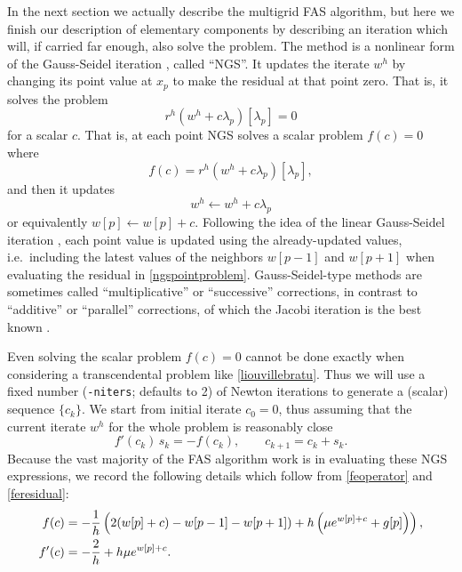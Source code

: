 \documentclass[letterpaper,final,12pt,reqno]{amsart}
\begin{document}
In the next section we actually describe the multigrid FAS algorithm, but here we finish our description of elementary components by describing an iteration which will, if carried far enough, also solve the problem.  The method is a nonlinear form of the Gauss-Seidel iteration \cite{Briggsetal2000}, called ``NGS''.  It updates the iterate $w^h$ by changing its point value at $x_p$ to make the residual at that point zero.  That is, it solves the problem
\begin{equation}
r^h(w^h + c \lambda_p)[\lambda_p] = 0  \label{ngspointproblem}
\end{equation}
for a scalar $c$.  That is, at each point NGS solves a scalar problem $f(c)=0$ where
\begin{equation}
  f(c) = r^h(w^h + c \lambda_p)[\lambda_p], \label{ngspointresidual}
\end{equation}
and then it updates
\begin{equation}
  w^h \leftarrow w^h + c \lambda_p  \label{ngspointupdate}
\end{equation}
or equivalently $w[p] \leftarrow w[p] + c$.  Following the idea of the linear Gauss-Seidel iteration \cite{Greenbaum1997}, each point value is updated using the already-updated values, i.e.~including the latest values of the neighbors $w[p-1]$ and $w[p+1]$ when evaluating the residual in \eqref{ngspointproblem}.  Gauss-Seidel-type methods are sometimes called ``multiplicative'' or ``successive'' corrections, in contrast to ``additive'' or ``parallel'' corrections, of which the Jacobi iteration is the best known \cite{Bueler2021}.

Even solving the scalar problem $f(c)=0$ cannot be done exactly when considering a transcendental problem like \eqref{liouvillebratu}.  Thus we will use a fixed number (\texttt{-niters}; defaults to 2) of Newton iterations to generate a (scalar) sequence $\{c_k\}$.  We start from initial iterate $c_0=0$, thus assuming that the current iterate $w^h$ for the whole problem is reasonably close
\begin{equation}
f'(c_k)\, s_k = -f(c_k),  \qquad  c_{k+1} = c_k + s_k. \label{ngsnewton}
\end{equation}
Because the vast majority of the FAS algorithm work is in evaluating these NGS expressions, we record the following details which follow from \eqref{feoperator} and \eqref{feresidual}:
\begin{align}
   f(c) &= -\frac{1}{h} \left(2(w[p]+c) - w[p-1] - w[p+1]) + h \left(\mu e^{w[p]+c} + g[p]\right)\right), \label{ngsnewtondetails} \\
   f'(c) &= -\frac{2}{h} + h \mu e^{w[p]+c}. \notag
\end{align}
\end{document}
